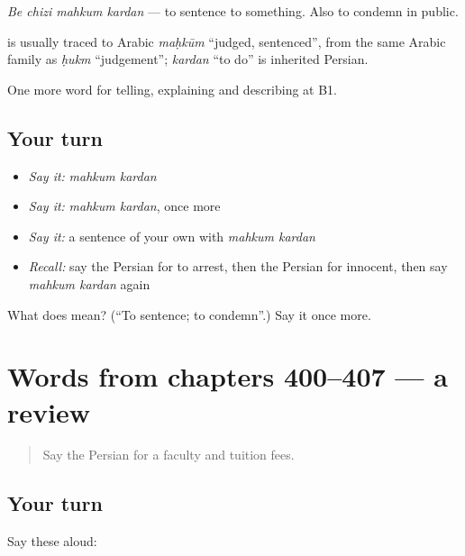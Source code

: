 \emph{Be chizi mahkum kardan} — to sentence to something. Also to condemn in public.

\begin{cousinweb}
\textbf{} is usually traced to Arabic \emph{maḥkūm} \textquotedblleft{}judged, sentenced\textquotedblright{}, from the same Arabic family as \emph{ḥukm} \textquotedblleft{}judgement\textquotedblright{}; \emph{kardan} \textquotedblleft{}to do\textquotedblright{} is inherited Persian.
\end{cousinweb}

\begin{grammarlens}[title={What you've built}]
One more word for telling, explaining and describing at B1.
\end{grammarlens}

\subsection*{Your turn}
\begin{itemize}
\raggedright
  \item \emph{Say it:} \emph{mahkum kardan}
  \item \emph{Say it:} \emph{mahkum kardan}, once more
  \item \emph{Say it:} a sentence of your own with \emph{mahkum kardan}
  \item \emph{Recall:} say the Persian for to arrest, then the Persian for innocent, then say \emph{mahkum kardan} again
\end{itemize}

\begin{tcolorbox}[breakable,colback=teal!4,colframe=teal!35!black,title={Before you move on}]
What does   mean? (\textquotedblleft{}To sentence; to condemn\textquotedblright{}.) Say it once more.
\end{tcolorbox}
\section[(dialogue)]{Words from chapters 400–407 — a review}

\label{lesson:FA-R407-review-400-407}



\begin{quote}
Say the Persian for a faculty and tuition fees.
\end{quote}

\subsection*{Your turn}
Say these aloud:

